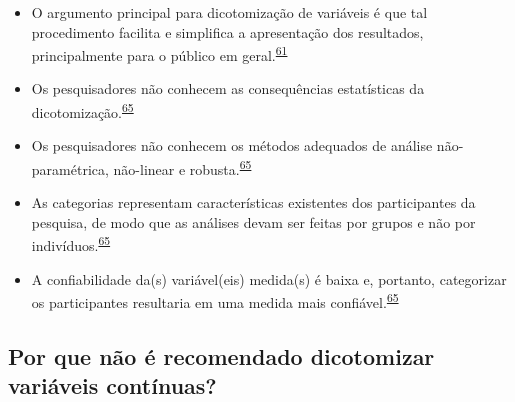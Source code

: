 \documentclass[
  a4paper,
]{book}
\begin{document}
\begin{itemize}
\item
  O argumento principal para dicotomização de variáveis é que tal procedimento facilita e simplifica a apresentação dos resultados, principalmente para o público em geral.\textsuperscript{\protect\hyperlink{ref-Fedorov2009}{61}}
\item
  Os pesquisadores não conhecem as consequências estatísticas da dicotomização.\textsuperscript{\protect\hyperlink{ref-MacCallum2002}{65}}
\item
  Os pesquisadores não conhecem os métodos adequados de análise não-paramétrica, não-linear e robusta.\textsuperscript{\protect\hyperlink{ref-MacCallum2002}{65}}
\item
  As categorias representam características existentes dos participantes da pesquisa, de modo que as análises devam ser feitas por grupos e não por indivíduos.\textsuperscript{\protect\hyperlink{ref-MacCallum2002}{65}}
\item
  A confiabilidade da(s) variável(eis) medida(s) é baixa e, portanto, categorizar os participantes resultaria em uma medida mais confiável.\textsuperscript{\protect\hyperlink{ref-MacCallum2002}{65}}
\end{itemize}

\hypertarget{por-que-nuxe3o-uxe9-recomendado-dicotomizar-variuxe1veis-contuxednuas}{%
\subsection{Por que não é recomendado dicotomizar variáveis contínuas?}\label{por-que-nuxe3o-uxe9-recomendado-dicotomizar-variuxe1veis-contuxednuas}}
\end{document}
